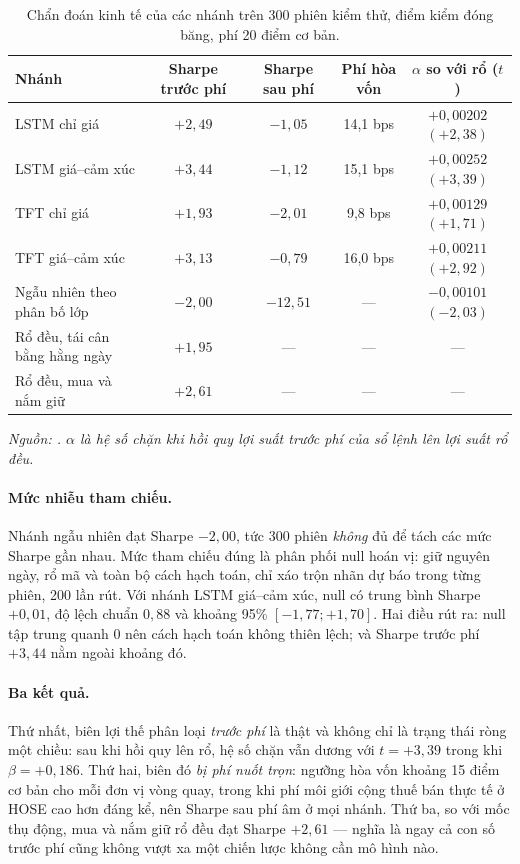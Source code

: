 \begin{table}[H]
  \centering
  \caption{Chẩn đoán kinh tế của các nhánh trên 300 phiên kiểm thử, điểm kiểm đóng băng, phí 20 điểm cơ bản.}
  \label{tab:kq-backtest}
  \begin{tabular}{l c c c c}
    \toprule
    Nhánh & Sharpe trước phí & Sharpe sau phí & Phí hòa vốn & $\alpha$ so với rổ ($t$) \\
    \midrule
    LSTM chỉ giá & $+2{,}49$ & $-1{,}05$ & 14,1 bps & $+0{,}00202$ $(+2{,}38)$ \\
    LSTM giá--cảm xúc & $+3{,}44$ & $-1{,}12$ & 15,1 bps & $+0{,}00252$ $(+3{,}39)$ \\
    TFT chỉ giá & $+1{,}93$ & $-2{,}01$ & 9,8 bps & $+0{,}00129$ $(+1{,}71)$ \\
    TFT giá--cảm xúc & $+3{,}13$ & $-0{,}79$ & 16,0 bps & $+0{,}00211$ $(+2{,}92)$ \\
    Ngẫu nhiên theo phân bố lớp & $-2{,}00$ & $-12{,}51$ & --- & $-0{,}00101$ $(-2{,}03)$ \\
    \midrule
    Rổ đều, tái cân bằng hằng ngày & $+1{,}95$ & --- & --- & --- \\
    Rổ đều, mua và nắm giữ & $+2{,}61$ & --- & --- & --- \\
    \bottomrule
  \end{tabular}
\noindent\textit{Nguồn: . $\alpha$ là hệ số chặn khi hồi quy lợi suất trước phí của sổ lệnh lên lợi suất rổ đều.}
\end{table}

\paragraph{Mức nhiễu tham chiếu.}
Nhánh ngẫu nhiên đạt Sharpe $-2{,}00$, tức 300 phiên \emph{không} đủ để tách các mức Sharpe
gần nhau. Mức tham chiếu đúng là phân phối null hoán vị: giữ nguyên ngày, rổ mã và toàn bộ
cách hạch toán, chỉ xáo trộn nhãn dự báo trong từng phiên, 200 lần rút. Với nhánh LSTM
giá--cảm xúc, null có trung bình Sharpe $+0{,}01$, độ lệch chuẩn $0{,}88$ và khoảng 95\%
$[-1{,}77; +1{,}70]$. Hai điều rút ra: null tập trung quanh 0 nên cách hạch toán không
thiên lệch; và Sharpe trước phí $+3{,}44$ nằm ngoài khoảng đó.

\paragraph{Ba kết quả.}
Thứ nhất, biên lợi thế phân loại \emph{trước phí} là thật và không chỉ là trạng thái ròng
một chiều: sau khi hồi quy lên rổ, hệ số chặn vẫn dương với $t = +3{,}39$ trong khi
$\beta = +0{,}186$. Thứ hai, biên đó \emph{bị phí nuốt trọn}: ngưỡng hòa vốn khoảng 15 điểm
cơ bản cho mỗi đơn vị vòng quay, trong khi phí môi giới cộng thuế bán thực tế ở HOSE cao
hơn đáng kể, nên Sharpe sau phí âm ở mọi nhánh. Thứ ba, so với mốc thụ động, mua và nắm
giữ rổ đều đạt Sharpe $+2{,}61$ --- nghĩa là ngay cả con số trước phí cũng không vượt xa
một chiến lược không cần mô hình nào.

